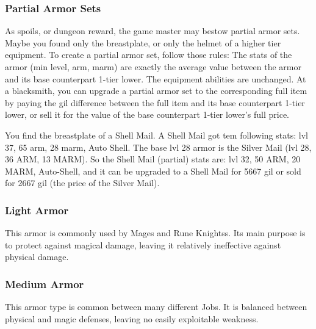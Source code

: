 \begin{multicols}{2}
\subsubsection{Partial Armor Sets}\label{subsec:inv-partial-armor}
As spoils,  or dungeon reward, the game master may bestow partial armor sets. Maybe you found only the breastplate, or only the helmet of a higher tier equipment. To create a partial armor set, follow those rules:
The stats of the armor (min level, arm, marm) are exactly the average value between the armor and its base counterpart 1-tier lower. The equipment abilities are unchanged. At a blacksmith, you can upgrade a partial armor set to the corresponding full item by paying the gil difference between the full item and its base counterpart 1-tier lower, or sell it for the value of the base counterpart 1-tier lower's full price.

\begin{boco}
You find the breastplate of a Shell Mail. A Shell Mail got tem following stats: lvl 37, 65 arm, 28 marm, Auto Shell. The base lvl 28 armor is the Silver Mail (lvl 28, 36 ARM, 13 MARM). So the Shell Mail (partial) stats are: lvl 32, 50 ARM, 20 MARM, Auto-Shell, and it can be upgraded to a Shell Mail for 5667 gil or sold for 2667 gil (the price of the Silver Mail).
\end{boco}

\end{multicols}
\clearpage
\subsubsection{Light Armor}

This armor is commonly used by Mages and Rune Knightss. Its main purpose is to protect against magical damage, leaving it relatively ineffective against physical damage.

\begin{tabarm}[label=inv-larm]
    
\end{tabarm}

\clearpage
\subsubsection{Medium Armor}

This armor type is common between many different Jobs.  It is balanced between physical and magic defenses, leaving no easily exploitable weakness.

\begin{tabarm}[label=inv-marm]
    
\end{tabarm}

